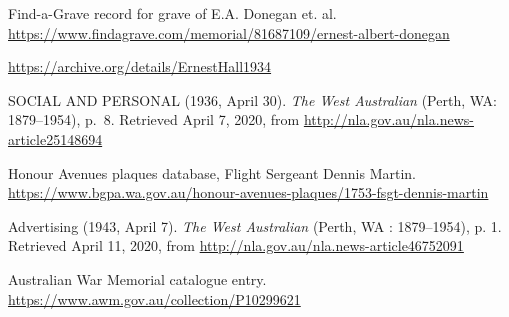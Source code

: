 \begin{thebibliography}{999}
	Find-a-Grave record for grave of E.A. Donegan et. al.
	\url{https://www.findagrave.com/memorial/81687109/ernest-albert-donegan}

	\url{https://archive.org/details/ErnestHall1934}

	SOCIAL AND PERSONAL (1936, April 30). \emph{The West Australian} (Perth, WA: 1879--1954), p.~8.
	Retrieved April 7, 2020, from \url{http://nla.gov.au/nla.news-article25148694}

	Honour Avenues plaques database, Flight Sergeant Dennis Martin.
	\url{https://www.bgpa.wa.gov.au/honour-avenues-plaques/1753-fsgt-dennis-martin}

	Advertising (1943, April 7). \emph{The West Australian} (Perth, WA : 1879--1954), p. 1.
	Retrieved April 11, 2020, from \url{http://nla.gov.au/nla.news-article46752091}

	Australian War Memorial catalogue entry.
	\url{https://www.awm.gov.au/collection/P10299621}

\end{thebibliography}
